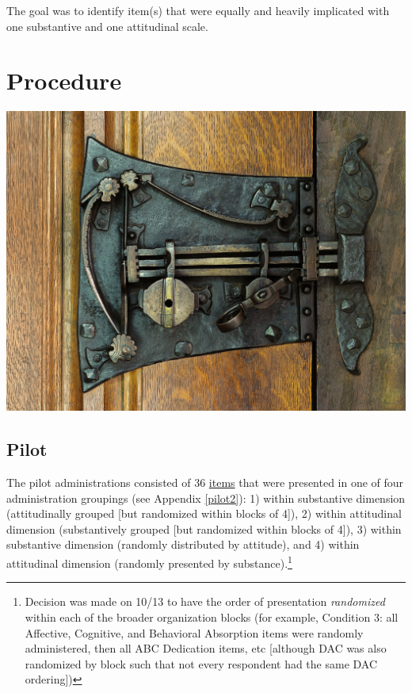 \documentclass[
]{book}
\begin{document}
The goal was to identify item(s) that were equally and heavily implicated with one substantive and one attitudinal scale.

\hypertarget{procedure}{%
\chapter{Procedure}\label{procedure}}

\includegraphics{procedure.jpg}

\hypertarget{conds}{%
\section{Pilot}\label{conds}}

The pilot administrations consisted of 36 \href{https://docs.google.com/document/d/18KYE7jq8XLhN-mfGQRMnkf5AM-_U2CJck50eISbAiwM/edit?usp=sharing}{items} that were presented in one of four administration groupings (see Appendix \ref{pilot2}): 1) within substantive dimension (attitudinally grouped {[}but randomized within blocks of 4{]}), 2) within attitudinal dimension (substantively grouped {[}but randomized within blocks of 4{]}), 3) within substantive dimension (randomly distributed by attitude), and 4) within attitudinal dimension (randomly presented by substance).\footnote{Decision was made on 10/13 to have the order of presentation \emph{randomized} within each of the broader organization blocks (for example, Condition 3: all Affective, Cognitive, and Behavioral Absorption items were randomly administered, then all ABC Dedication items, etc {[}although DAC was also randomized by block such that not every respondent had the same DAC ordering{]})}
\end{document}
